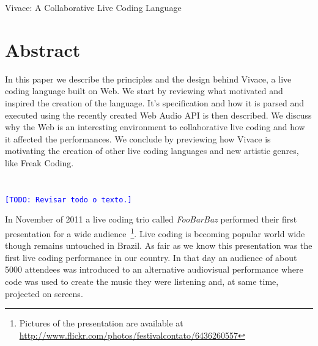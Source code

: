 \documentclass[letterpaper, 12pt]{article}
\newcommand{\inote}[1]{\textcolor{blue}{\texttt{\footnotesize[#1]}}}
\newcommand{\todo}[1]{\inote{TODO: #1}}
\begin{document}

\vspace*{24pt}


 {\cmjTitle Vivace: A Collaborative Live Coding Language}


\section*{Abstract}

In this paper we describe the principles and the design behind Vivace,
a live coding language built on Web. We start by reviewing what
motivated and inspired the creation of the language. It's
specification and how it is parsed and executed using the recently
created Web Audio API is then described. We discuss why the Web is an
interesting environment to collaborative live coding and how it
affected the performances. We conclude by previewing how Vivace is
motivating the creation of other live coding languages and new
artistic genres, like Freak Coding.

\section*{} %

\todo{Revisar todo o texto.}

In November of 2011 a live coding trio called \textit{FooBarBaz}
performed their first presentation for a wide
audience~\footnote{Pictures of the presentation are available at
  \url{http://www.flickr.com/photos/festivalcontato/6436260557}}. Live
coding is becoming popular world wide though remains untouched in
Brazil. As fair as we know this presentation was the first live coding
performance in our country. In that day an audience of about 5000
attendees was introduced to an alternative audiovisual performance
where code was used to create the music they were listening and, at
same time, projected on screens.
\end{document}
